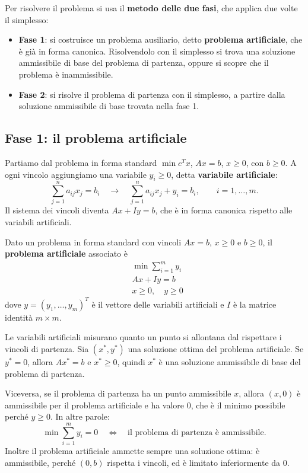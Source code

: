 Per risolvere il problema si usa il \textbf{metodo delle due fasi}, che applica due volte il simplesso:
\begin{itemize}
    \item \textbf{Fase 1}: si costruisce un problema ausiliario, detto \textbf{problema artificiale}, che è già in forma canonica. Risolvendolo con il simplesso si trova una soluzione ammissibile di base del problema di partenza, oppure si scopre che il problema è inammissibile.
    \item \textbf{Fase 2}: si risolve il problema di partenza con il simplesso, a partire dalla soluzione ammissibile di base trovata nella fase 1.
\end{itemize}

\subsection{Fase 1: il problema artificiale}
Partiamo dal problema in forma standard $\min c^T x$, $Ax = b$, $x \ge 0$, con $b \ge 0$. A ogni vincolo aggiungiamo una variabile $y_i \ge 0$, detta \textbf{variabile artificiale}:
\[
\sum_{j=1}^{n} a_{ij} x_j = b_i \quad\longrightarrow\quad \sum_{j=1}^{n} a_{ij} x_j + y_i = b_i, \qquad i = 1, \dots, m.
\]
Il sistema dei vincoli diventa $Ax + Iy = b$, che è in forma canonica rispetto alle variabili artificiali.

\begin{definizione}\label{def:artificiale}
Dato un problema in forma standard con vincoli $Ax = b$, $x \ge 0$ e $b \ge 0$, il \textbf{problema artificiale} associato è
\[
\begin{aligned}
&\min \sum_{i=1}^{m} y_i \\
&Ax + Iy = b \\
&x \ge 0, \quad y \ge 0
\end{aligned}
\]
dove $y = (y_1, \dots, y_m)^T$ è il vettore delle variabili artificiali e $I$ è la matrice identità $m \times m$.
\end{definizione}

Le variabili artificiali misurano quanto un punto si allontana dal rispettare i vincoli di partenza. Sia $(x^*, y^*)$ una soluzione ottima del problema artificiale. Se $y^* = 0$, allora $Ax^* = b$ e $x^* \ge 0$, quindi $x^*$ è una soluzione ammissibile di base del problema di partenza.

Viceversa, se il problema di partenza ha un punto ammissibile $x$, allora $(x, 0)$ è ammissibile per il problema artificiale e ha valore $0$, che è il minimo possibile perché $y \ge 0$. In altre parole:
\[
\min \sum_{i=1}^{m} y_i = 0 \quad\Longleftrightarrow\quad \text{il problema di partenza è ammissibile}.
\]
Inoltre il problema artificiale ammette sempre una soluzione ottima: è ammissibile, perché $(0, b)$ rispetta i vincoli, ed è limitato inferiormente da $0$.

